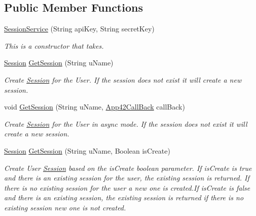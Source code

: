 \subsection*{Public Member Functions}
\begin{DoxyCompactItemize}
\item 
\hyperlink{classcom_1_1shephertz_1_1app42_1_1paas_1_1sdk_1_1csharp_1_1session_1_1_session_service_a52035722fd3ec824fe99fa9e63359450}{Session\+Service} (String api\+Key, String secret\+Key)
\begin{DoxyCompactList}\small\item\em This is a constructor that takes. \end{DoxyCompactList}\item 
\hyperlink{classcom_1_1shephertz_1_1app42_1_1paas_1_1sdk_1_1csharp_1_1session_1_1_session}{Session} \hyperlink{classcom_1_1shephertz_1_1app42_1_1paas_1_1sdk_1_1csharp_1_1session_1_1_session_service_a52f54737af85d5b49edc1d388f188854}{Get\+Session} (String u\+Name)
\begin{DoxyCompactList}\small\item\em Create \hyperlink{classcom_1_1shephertz_1_1app42_1_1paas_1_1sdk_1_1csharp_1_1session_1_1_session}{Session} for the User. If the session does not exist it will create a new session. \end{DoxyCompactList}\item 
void \hyperlink{classcom_1_1shephertz_1_1app42_1_1paas_1_1sdk_1_1csharp_1_1session_1_1_session_service_acfd7db5ead94014ba714963809132833}{Get\+Session} (String u\+Name, \hyperlink{interfacecom_1_1shephertz_1_1app42_1_1paas_1_1sdk_1_1csharp_1_1_app42_call_back}{App42\+Call\+Back} call\+Back)
\begin{DoxyCompactList}\small\item\em Create \hyperlink{classcom_1_1shephertz_1_1app42_1_1paas_1_1sdk_1_1csharp_1_1session_1_1_session}{Session} for the User in async mode. If the session does not exist it will create a new session. \end{DoxyCompactList}\item 
\hyperlink{classcom_1_1shephertz_1_1app42_1_1paas_1_1sdk_1_1csharp_1_1session_1_1_session}{Session} \hyperlink{classcom_1_1shephertz_1_1app42_1_1paas_1_1sdk_1_1csharp_1_1session_1_1_session_service_ab2f56a24e81205c0223f9e1951b53c03}{Get\+Session} (String u\+Name, Boolean is\+Create)
\begin{DoxyCompactList}\small\item\em Create User \hyperlink{classcom_1_1shephertz_1_1app42_1_1paas_1_1sdk_1_1csharp_1_1session_1_1_session}{Session} based on the is\+Create boolean parameter. If is\+Create is true and there is an existing session for the user, the existing session is returned. If there is no existing session for the user a new one is created.\+If is\+Create is false and there is an existing session, the existing session is returned if there is no existing session new one is not created. \end{DoxyCompactList}\item 

\end{DoxyCompactItemize}

